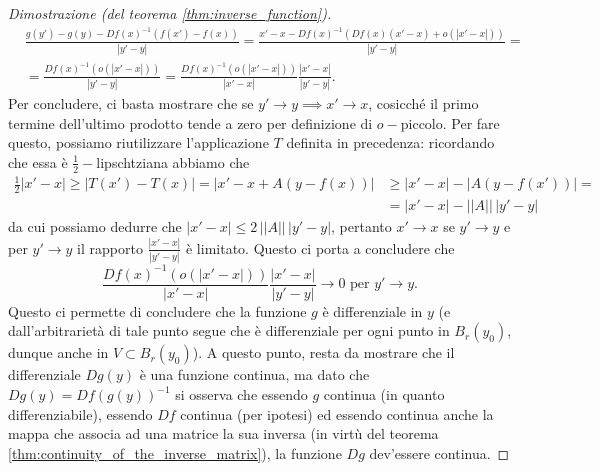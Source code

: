 \begin{proof}[Dimostrazione (del teorema \ref{thm:inverse_function})]
    \begin{align*}
    &\frac{g(y') - g(y) - Df(x)^{-1}(f(x')-f(x))}{|y' - y|} = \frac{x' - x - Df(x)^{-1}(Df(x)(x'-x) + o(|x' - x|))}{|y' - y|} = \\
    &=\frac{Df(x)^{-1}(o(|x'-x|))}{|y'-y|} = \frac{Df(x)^{-1}(o(|x'-x|))}{|x'-x|} \frac{|x'-x|}{|y'-y|}.
    \end{align*}
    Per concludere, ci basta mostrare che se $y' \to y \implies x' \to x$, cosicché il primo termine dell'ultimo prodotto tende a zero per definizione di $o-$piccolo. Per fare questo, possiamo riutilizzare
    l'applicazione $T$ definita in precedenza: ricordando che essa è $\frac{1}{2}-$lipschtziana abbiamo che
    \begin{align*}
    \frac{1}{2} |x' - x| \geq  |T(x') - T(x)| = |x' - x + A(y - f(x))| &\geq |x' - x| - |A(y - f(x'))| = & \\
    &=|x'-x| - || A || \, |y'-y| &
    \end{align*}
    da cui possiamo dedurre che $|x' - x| \leq 2 \, || A || \, |y' - y|$, pertanto $x' \to x$ se $y' \to y$ e per $y' \to y$ il rapporto $\frac{|x'-x|}{|y'-y|}$ è limitato. Questo ci porta a concludere che
    $$
    \frac{Df(x)^{-1}(o(|x'-x|))}{|x'-x|} \frac{|x'-x|}{|y'-y|} \to 0 \text{ per } y' \to y.
    $$
    Questo ci permette di concludere che la funzione $g$ è differenziale in $y$ (e dall'arbitrarietà di tale punto segue che è differenziale per ogni punto in $B_r(y_0)$, dunque anche in $V \subset B_r(y_0)$). A
    questo punto, resta da mostrare che il differenziale $Dg(y)$ è una funzione continua, ma dato che $Dg(y) = Df(g(y))^{-1}$ si osserva che essendo $g$ continua (in quanto differenziabile), essendo $Df$ continua (per ipotesi)
    ed essendo continua anche la mappa che associa ad una matrice la sua inversa (in virtù del teorema \ref{thm:continuity_of_the_inverse_matrix}), la funzione $Dg$ dev'essere continua.
\end{proof}
